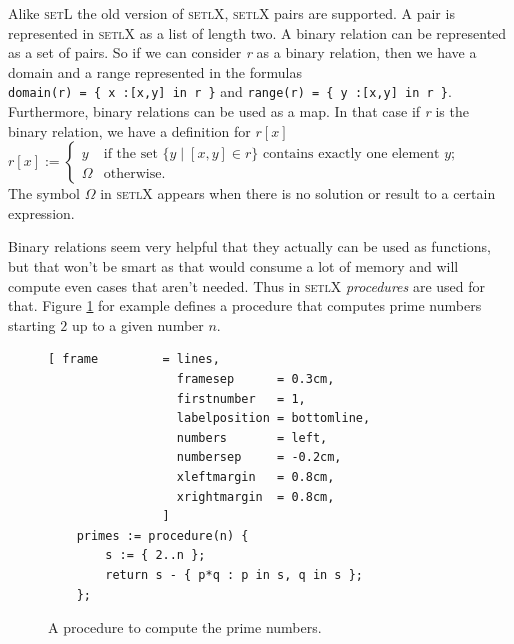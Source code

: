 \documentclass[11pt]{report}
\begin{document}
Alike \textsc{setL} the old version of \textsc{setlX}, \textsc{setlX} pairs are supported. A pair is represented in \textsc{setlX} as a list of length two. A binary relation can be represented as a set of pairs. So if we can consider \textsl{r} as a binary relation, then we have a domain and a range represented in the formulas 
\\[0.2cm]
\hspace*{1.3cm}
\texttt{domain(r) = \{ x :[x,y] in r \}} \quad and \quad
\texttt{range(r)  = \{ y :[x,y] in r \}}.
\\[0.2cm]
Furthermore, binary relations can be used as a map. In that case if \textsl{r} is the binary relation, we have a definition for $r[x]$
\\[0.2cm]
\hspace*{1.3cm}
$r[x] := \left\{
\begin{array}{ll}
  y & \mbox{if the set $\{ y \mid [x,y] \in r\}$ contains exactly one element $y$;} \\[0.2cm]
  \Omega & \mbox{otherwise}.
\end{array} \right.
$
\\[0.2cm]
The symbol $\Omega$ in \textsc{setlX} appears when there is no solution or result to a certain expression.

Binary relations seem very helpful that they actually can be used as functions, but that won't be smart as that would consume a lot of memory and will compute even cases that aren't needed. Thus in \textsc{setlX} \textsl{procedures} are used for that. Figure \ref{fig:primes.stlx} for example defines a procedure that computes prime numbers starting $2$ up to a given number $n$.
\begin{figure}[!ht]
\centering
\begin{Verbatim}[ frame         = lines, 
                  framesep      = 0.3cm, 
                  firstnumber   = 1,
                  labelposition = bottomline,
                  numbers       = left,
                  numbersep     = -0.2cm,
                  xleftmargin   = 0.8cm,
                  xrightmargin  = 0.8cm,
                ]
    primes := procedure(n) { 
        s := { 2..n }; 
        return s - { p*q : p in s, q in s }; 
    };
\end{Verbatim}
\vspace*{-0.3cm}
\caption{A procedure to compute the prime numbers.}
\label{fig:primes.stlx}
\end{figure}
\end{document}
